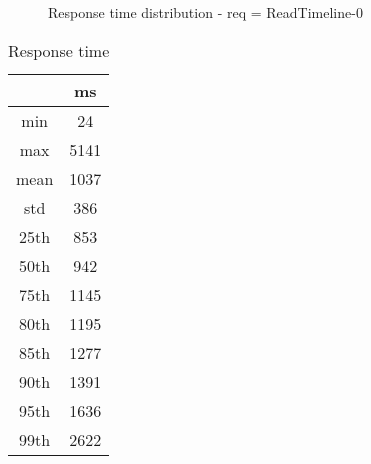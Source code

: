\begin{minipage}{0.75\linewidth}
\begin{figure}[h]
\begin{adjustbox}{max width=1.0\linewidth, keepaspectratio}
  \end{adjustbox}
  \caption{Response time distribution - req = ReadTimeline-0}
\end{figure}
\end{minipage}\hfill\begin{minipage}{0.18\linewidth}
\begin{table}[h]
\begin{tabular}{|cc|}
\hline
\textbf{} & \textbf{ms}\\ \hline
 \Xhline{0.005\arrayrulewidth}
min & 24\\
 \Xhline{0.005\arrayrulewidth}
max & 5141\\
 \Xhline{0.005\arrayrulewidth}
mean & 1037\\
 \Xhline{0.005\arrayrulewidth}
std & 386\\
\hline
\hline
 \Xhline{0.005\arrayrulewidth}
25th & 853\\
 \Xhline{0.005\arrayrulewidth}
50th & 942\\
 \Xhline{0.005\arrayrulewidth}
75th & 1145\\
 \Xhline{0.005\arrayrulewidth}
80th & 1195\\
 \Xhline{0.005\arrayrulewidth}
85th & 1277\\
 \Xhline{0.005\arrayrulewidth}
90th & 1391\\
 \Xhline{0.005\arrayrulewidth}
95th & 1636\\
 \Xhline{0.005\arrayrulewidth}
99th & 2622\\
\hline
\end{tabular}
\caption{Response time}
\end{table}
\end{minipage}\hfill